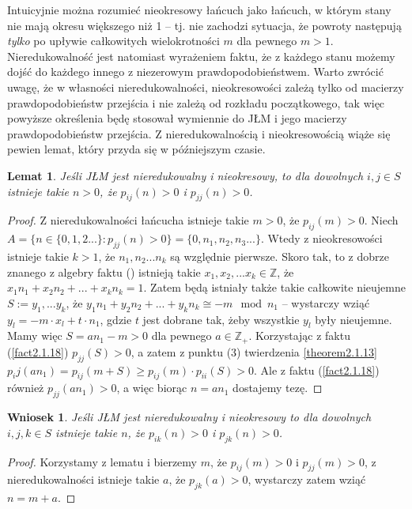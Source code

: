 \documentclass[a4paper]{article}
\theoremstyle{defn}
\theoremstyle{theorem}
\theoremstyle{lemma}
\newtheorem{lemma}[defn]{Lemat}
\theoremstyle{cor}
\newtheorem{cor}[defn]{Wniosek}
\theoremstyle{fact}
\begin{document}
Intuicyjnie można rozumieć nieokresowy łańcuch jako łańcuch, w którym stany nie mają okresu większego niż 1 – tj. nie zachodzi sytuacja, że powroty następują \textit{tylko} po upływie całkowitych wielokrotności $m$ dla pewnego $m>1$. Nieredukowalność jest natomiast wyrażeniem faktu, że z każdego stanu możemy dojść do każdego innego z niezerowym prawdopodobieństwem. Warto zwrócić uwagę, że w własności nieredukowalności, nieokresowości zależą tylko od macierzy prawdopodobieństw przejścia i nie zależą od rozkładu początkowego, tak więc powyższe określenia będę stosował wymiennie do JŁM i jego macierzy prawdopodobieństw przejścia. Z nieredukowalnością i nieokresowością wiąże się pewien lemat, który przyda się w późniejszym czasie.
\begin{lemma}\label{lemma2.1.19}
Jeśli JŁM jest nieredukowalny i nieokresowy, to dla dowolnych $i,j \in S$ istnieje takie $n > 0$, że $p_{ij}(n) > 0$ i $p_{jj}(n) > 0$.
\end{lemma}
\begin{proof}
Z nieredukowalności łańcucha istnieje takie $m > 0$, że $p_{ij}(m) > 0$.  Niech $A = \{n \in \{0, 1, 2...\}:  p_{jj}(n) > 0\} = \{0, n_1, n_2, n_3 ... \}$. Wtedy z nieokresowości istnieje takie $k > 1$, że $n_1, n_2... n_k$ są względnie pierwsze. Skoro tak, to z dobrze znanego z algebry faktu () istnieją takie $x_1, x_2, ... x_k \in \mathbb{Z}$, że $x_1n_1 + x_2n_2 + ... + x_k n_k = 1$.  Zatem będą istniały także takie całkowite nieujemne $S := y_1, ... y_k$, że $y_1n_1 + y_2n_2 + ... + y_k n_k \cong -m \mod n_1$ – wystarczy wziąć $y_l = -m \cdot x_l + t \cdot n_1$, gdzie $t$ jest dobrane tak, żeby wszystkie $y_l$ były nieujemne. Mamy więc $S = an_1 - m > 0$ dla pewnego $a \in \mathbb{Z}_+$. Korzystając z faktu (\ref{fact2.1.18}) $p_{jj}(S) > 0$, a zatem z punktu (3) twierdzenia \ref{theorem2.1.13}  $p_ij(an_1) = p_{ij}(m + S) \geq p_{ij}(m)\cdot p_{ii}(S) > 0$. Ale z faktu (\ref{fact2.1.18}) również $p_{jj}(an_1) > 0$, a więc biorąc $n = an_1$ dostajemy tezę.
\end{proof}

\begin{cor}\label{cor2.1.20}
Jeśli JŁM jest nieredukowalny i nieokresowy to dla dowolnych $i,j,k \in S$ istnieje takie $n$, że $p_{ik}(n) > 0$ i $p_{jk}(n) > 0$.
\end{cor}
\begin{proof}
Korzystamy z lematu i bierzemy $m$, że $p_{ij}(m) > 0$ i $p_{jj}(m) > 0$, z nieredukowalności istnieje takie $a$, że $p_{jk}(a) > 0$, wystarczy zatem wziąć $n = m + a$.
\end{proof}
\end{document}
